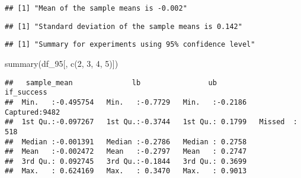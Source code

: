 \documentclass[
]{article}
\newenvironment{Shaded}{\begin{snugshade}}{\end{snugshade}}
\newcommand{\DecValTok}[1]{\textcolor[rgb]{0.00,0.00,0.81}{#1}}
\newcommand{\FunctionTok}[1]{\textcolor[rgb]{0.00,0.00,0.00}{#1}}
\newcommand{\NormalTok}[1]{#1}
\newcommand{\OtherTok}[1]{\textcolor[rgb]{0.56,0.35,0.01}{#1}}
\newcommand{\SpecialCharTok}[1]{\textcolor[rgb]{0.00,0.00,0.00}{#1}}
\newcommand{\StringTok}[1]{\textcolor[rgb]{0.31,0.60,0.02}{#1}}
\begin{document}
\begin{verbatim}
## [1] "Mean of the sample means is -0.002"
\end{verbatim}

\begin{Shaded}
\end{Shaded}

\begin{verbatim}
## [1] "Standard deviation of the sample means is 0.142"
\end{verbatim}

\begin{Shaded}
\end{Shaded}

\begin{verbatim}
## [1] "Summary for experiments using 95% confidence level"
\end{verbatim}

\begin{Shaded}
\begin{Highlighting}[]
\FunctionTok{summary}\NormalTok{(df\_95[, }\FunctionTok{c}\NormalTok{(}\DecValTok{2}\NormalTok{, }\DecValTok{3}\NormalTok{, }\DecValTok{4}\NormalTok{, }\DecValTok{5}\NormalTok{)])}
\end{Highlighting}
\end{Shaded}

\begin{verbatim}
##   sample_mean              lb                ub             if_success  
##  Min.   :-0.495754   Min.   :-0.7729   Min.   :-0.2186   Captured:9482  
##  1st Qu.:-0.097267   1st Qu.:-0.3744   1st Qu.: 0.1799   Missed  : 518  
##  Median :-0.001391   Median :-0.2786   Median : 0.2758                  
##  Mean   :-0.002472   Mean   :-0.2797   Mean   : 0.2747                  
##  3rd Qu.: 0.092745   3rd Qu.:-0.1844   3rd Qu.: 0.3699                  
##  Max.   : 0.624169   Max.   : 0.3470   Max.   : 0.9013
\end{verbatim}
\end{document}
